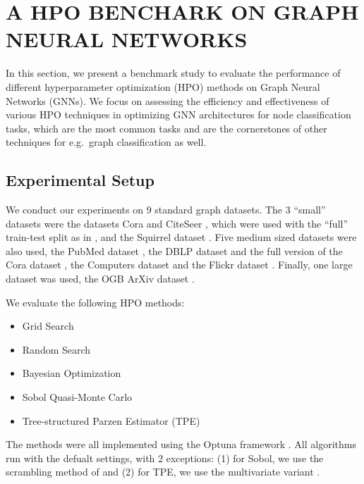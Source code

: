 \section{\uppercase{A HPO Benchark on Graph Neural Networks}}
\label{sec:benchmark}

In this section, we present a benchmark study to evaluate the performance of different hyperparameter optimization (HPO) methods on Graph Neural Networks (GNNs). We focus on assessing the efficiency and effectiveness of various HPO techniques in optimizing GNN architectures for node classification tasks, which are the most common tasks and are the cornerstones of other techniques for e.g.\ graph classification as well.

\subsection{Experimental Setup}
We conduct our experiments on 9 standard graph datasets. The 3 \enquote{small} datasets were the datasets Cora and CiteSeer \cite{yang_revisiting_2016}, which were used with the \enquote{full} train-test split as in \cite{chen_fastgcn_2018}, and the Squirrel dataset \cite{rozemberczki_multi-scale_2021}. Five medium sized datasets were also used, the PubMed dataset \cite{yang_revisiting_2016}, the DBLP dataset and the full version of the Cora dataset \cite{bojchevski_deep_2018}, the Computers dataset \cite{shchur_pitfalls_2019} and the Flickr dataset \cite{zeng_graphsaint_2019}. Finally, one large dataset was used, the OGB ArXiv dataset \cite{hu_open_2021}.

We evaluate the following HPO methods:
\begin{itemize}
	\item Grid Search
	\item Random Search
	\item Bayesian Optimization \cite{rasmussen_gaussian_2003, snoek_practical_2012}
	\item Sobol Quasi-Monte Carlo \cite{sobol_distribution_1967, bergstra_random_2012}
	\item Tree-structured Parzen Estimator (TPE) \cite{bergstra_algorithms_2011}
\end{itemize}
The methods were all implemented using the Optuna framework \cite{akiba_optuna_2019}. All algorithms run with the defualt settings, with 2 exceptions: (1) for Sobol, we use the scrambling method of \cite{matousek_l2-discrepancy_1998} and (2) for TPE, we use the multivariate variant \cite{falkner_bohb_2018}.

